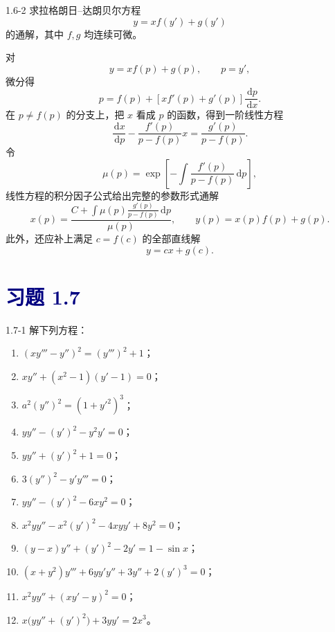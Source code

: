 \documentclass[UTF8,a4paper,11pt]{ctexart}
\newcommand{\dd}{\,\mathrm d}
\newcommand{\sect}[1]{\section*{\textcolor{navy}{习题 #1}}}
\begin{document}
\begin{problem}{1.6-2}
求拉格朗日--达朗贝尔方程
  \[
    y=xf(y')+g(y')
  \]
  的通解，其中 $f,g$ 均连续可微。
\end{problem}

\begin{solution}
对
\[
y=xf(p)+g(p),\qquad p=y',
\]
微分得
\[
p=f(p)+[xf'(p)+g'(p)]\frac{\dd p}{\dd x}.
\]
在 $p\ne f(p)$ 的分支上，把 $x$ 看成 $p$ 的函数，得到一阶线性方程
\[
\frac{\dd x}{\dd p}-\frac{f'(p)}{p-f(p)}x
=\frac{g'(p)}{p-f(p)}.
\]
令
\[
\mu(p)=\exp\!\left[-\int\frac{f'(p)}{p-f(p)}\dd p\right],
\]
线性方程的积分因子公式给出完整的参数形式通解
\[
\boxed{
x(p)=\frac{C+\displaystyle\int
\mu(p)\frac{g'(p)}{p-f(p)}\dd p}{\mu(p)},\qquad
y(p)=x(p)f(p)+g(p)}.
\]
此外，还应补上满足 $c=f(c)$ 的全部直线解
\[
\boxed{y=cx+g(c)}.
\]
\end{solution}


\sect{1.7}
\begin{problem}{1.7-1}
解下列方程：
  \begin{enumerate}[label=(\arabic*)]
    \item $\displaystyle (xy'''-y'')^2=(y''')^2+1$；
    \item $\displaystyle xy''+(x^2-1)(y'-1)=0$；
    \item $\displaystyle a^2(y'')^2=(1+y'^2)^3$；
    \item $\displaystyle yy''-(y')^2-y^2y'=0$；
    \item $\displaystyle yy''+(y')^2+1=0$；
    \item $\displaystyle 3(y'')^2-y'y'''=0$；
    \item $\displaystyle yy''-(y')^2-6xy^2=0$；
    \item $\displaystyle x^2yy''-x^2(y')^2-4xyy'+8y^2=0$；
    \item $\displaystyle (y-x)y''+(y')^2-2y'=1-\sin x$；
    \item $\displaystyle (x+y^2)y'''+6yy'y''+3y''+2(y')^3=0$；
    \item $\displaystyle x^2yy''+(xy'-y)^2=0$；
    \item $\displaystyle x\bigl(yy''+(y')^2\bigr)+3yy'=2x^3$。
  \end{enumerate}
\end{problem}
\end{document}
